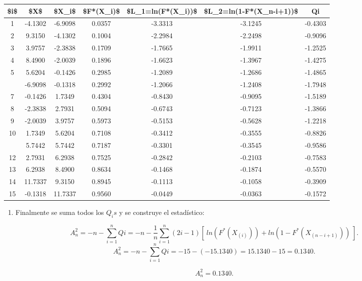 \documentclass[
  a4paper,
  oneside,
  openany]{book}
\providecommand{\tightlist}{%
  \setlength{\itemsep}{0pt}\setlength{\parskip}{0pt}}
\begin{document}
\begin{table}
\centering
\begin{tabular}{ccccccc}
\toprule
\$i\$ & \$X\$ & \$X\_i\$ & \$F*(X\_i)\$ & \$L\_1=ln(F*(X\_i))\$ & \$L\_2=ln(1-F*(X\_n-i+1))\$ & Qi\\
\midrule
1 & -4.1302 & -6.9098 & 0.0357 & -3.3313 & -3.1245 & -0.4303\\
2 & 9.3150 & -4.1302 & 0.1004 & -2.2984 & -2.2498 & -0.9096\\
3 & 3.9757 & -2.3838 & 0.1709 & -1.7665 & -1.9911 & -1.2525\\
4 & 8.4900 & -2.0039 & 0.1896 & -1.6623 & -1.3967 & -1.4275\\
5 & 5.6204 & -0.1426 & 0.2985 & -1.2089 & -1.2686 & -1.4865\\
\addlinespace
6 & -6.9098 & -0.1318 & 0.2992 & -1.2066 & -1.2408 & -1.7948\\
7 & -0.1426 & 1.7349 & 0.4304 & -0.8430 & -0.9095 & -1.5189\\
8 & -2.3838 & 2.7931 & 0.5094 & -0.6743 & -0.7123 & -1.3866\\
9 & -2.0039 & 3.9757 & 0.5973 & -0.5153 & -0.5628 & -1.2218\\
10 & 1.7349 & 5.6204 & 0.7108 & -0.3412 & -0.3555 & -0.8826\\
\addlinespace
11 & 5.7442 & 5.7442 & 0.7187 & -0.3301 & -0.3545 & -0.9586\\
12 & 2.7931 & 6.2938 & 0.7525 & -0.2842 & -0.2103 & -0.7583\\
13 & 6.2938 & 8.4900 & 0.8634 & -0.1468 & -0.1874 & -0.5570\\
14 & 11.7337 & 9.3150 & 0.8945 & -0.1113 & -0.1058 & -0.3909\\
15 & -0.1318 & 11.7337 & 0.9560 & -0.0449 & -0.0363 & -0.1572\\
\bottomrule
\end{tabular}
\end{table}

\begin{enumerate}
\def\labelenumi{\arabic{enumi})}
\setcounter{enumi}{6}
\tightlist
\item
  Finalmente se suma todos los \(Q_{i}s\) y se construye el estadístico:
\end{enumerate}

\[A_n^2=-n-\sum_{i=1}^{n}Qi=-n-\frac{1}{n}\sum_{i=1}^{n}\left(2i-1\right)[ \ ln(F^*(X_{(i)})) +ln(1-F^*(X_{(n-i+1)})) \ ].\]
\[A_n^2=-n-\sum_{i=1}^{n}Qi=-15-(-15.1340)=15.1340-15=0.1340.\]

\[A_n^2=0.1340.\]
\end{document}

